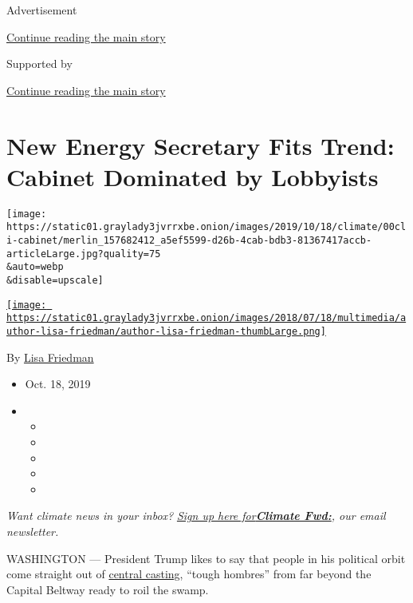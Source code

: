 Advertisement

\protect\hyperlink{after-top}{Continue reading the main story}

Supported by

\protect\hyperlink{after-sponsor}{Continue reading the main story}

\hypertarget{new-energy-secretary-fits-trend-cabinet-dominated-by-lobbyists}{%
\section{New Energy Secretary Fits Trend: Cabinet Dominated by
Lobbyists}\label{new-energy-secretary-fits-trend-cabinet-dominated-by-lobbyists}}

\texttt{[image: https://static01.graylady3jvrrxbe.onion/images/2019/10/18/climate/00cli-cabinet/merlin\_157682412\_a5ef5599-d26b-4cab-bdb3-81367417accb-articleLarge.jpg?quality=75\\\&auto=webp\\\&disable=upscale]}

\href{https://www.nytimes3xbfgragh.onion/by/lisa-friedman}{\texttt{[image: https://static01.graylady3jvrrxbe.onion/images/2018/07/18/multimedia/author-lisa-friedman/author-lisa-friedman-thumbLarge.png]}}

By \href{https://www.nytimes3xbfgragh.onion/by/lisa-friedman}{Lisa
Friedman}

\begin{itemize}
\item
  Oct. 18, 2019
\item
  \begin{itemize}
  \item
  \item
  \item
  \item
  \item
  \end{itemize}
\end{itemize}

\emph{Want climate news in your inbox?}
\href{https://www.nytimes3xbfgragh.onion/newsletters/climate-change}{\emph{Sign
up here
for}}\textbf{\href{https://www.nytimes3xbfgragh.onion/newsletters/climate-change}{\emph{Climate
Fwd:}}}\emph{, our email newsletter.}

WASHINGTON --- President Trump likes to say that people in his political
orbit come straight out of
\href{https://www.nytimes3xbfgragh.onion/2017/01/20/us/politics/president-trump-day.html}{central
casting}, ``tough hombres'' from far beyond the Capital Beltway ready to
roil the swamp.

